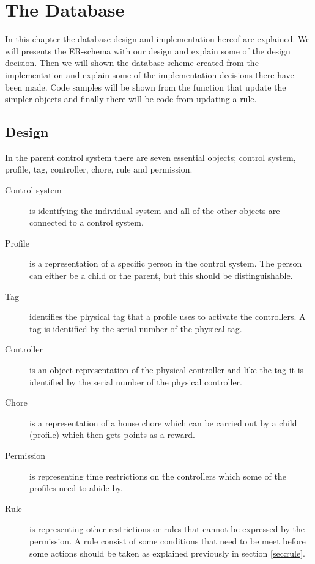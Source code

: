 \chapter{The Database}
\label{chap:database} 
In this chapter the database design and implementation hereof are explained. We will presents the ER-schema with our design and explain some of the design decision. Then we will shown the database scheme created from the implementation and explain some of the implementation decisions there have been made. Code samples will be shown from the function that update the simpler objects and finally there will be code from updating a rule.  
  
\section{Design}
\label{sec:DBdesign}
In the parent control system there are seven essential objects; control system, profile, tag, controller, chore, rule and permission. 

\begin{description}
	\item[Control system] is identifying the individual system and all of the other objects are connected to a control system.
	\item[Profile] is a representation of a specific person in the control system. The person can either be a child or the parent, but this should be distinguishable.
	\item[Tag] identifies the physical tag that a profile uses to activate the controllers. A tag is identified by the serial number of the physical tag.
	\item[Controller]	is an object representation of the physical controller and like the tag it is identified by the serial number of the physical controller.
	\item[Chore] is a representation of a house chore which can be carried out by a child (profile) which then gets points as a reward.
	\item[Permission] is representing time restrictions on the controllers which some of the profiles need to abide by. 
	\item[Rule] is representing other restrictions or rules that cannot be expressed by the permission. A rule consist of some conditions that need to be meet before some actions should be taken as explained previously in section \vref{sec:rule}. 
\end{description}

